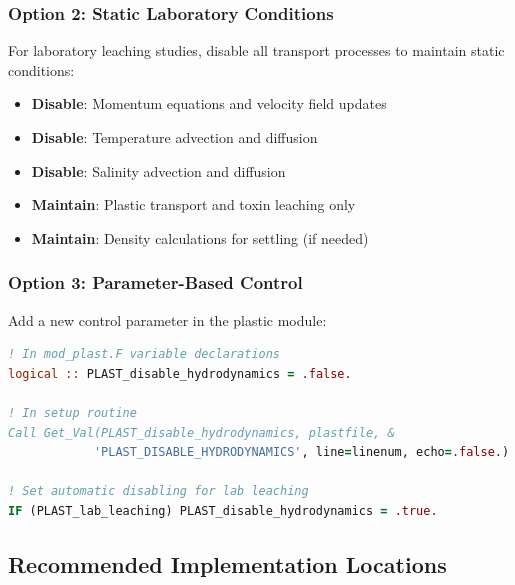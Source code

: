 \documentclass[12pt,a4paper]{article}
\begin{document}
\subsubsection{Option 2: Static Laboratory Conditions}

For laboratory leaching studies, disable all transport processes to maintain static conditions:

\begin{itemize}
    \item \textbf{Disable}: Momentum equations and velocity field updates
    \item \textbf{Disable}: Temperature advection and diffusion
    \item \textbf{Disable}: Salinity advection and diffusion
    \item \textbf{Maintain}: Plastic transport and toxin leaching only
    \item \textbf{Maintain}: Density calculations for settling (if needed)
\end{itemize}

\subsubsection{Option 3: Parameter-Based Control}

Add a new control parameter in the plastic module:

\begin{lstlisting}[language=Fortran, caption=New Control Parameter]
! In mod_plast.F variable declarations
logical :: PLAST_disable_hydrodynamics = .false.

! In setup routine
Call Get_Val(PLAST_disable_hydrodynamics, plastfile, &
            'PLAST_DISABLE_HYDRODYNAMICS', line=linenum, echo=.false.)

! Set automatic disabling for lab leaching
IF (PLAST_lab_leaching) PLAST_disable_hydrodynamics = .true.
\end{lstlisting}

\subsection{Recommended Implementation Locations}
\end{document}
